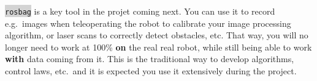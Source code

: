 \documentclass[10pt,a4paper]{upmc}
\newcommand{\mytext}[1]{\colorbox{lightgray}{\texttt{#1}}}
\begin{document}
\mytext{rosbag} is a key tool in the projet coming next. You can use it to record e.g.\ images when
teleoperating the robot to calibrate your image processing algorithm, or laser scans to correctly
detect obstacles, etc. That way, you will no longer need to work at 100\% \textbf{on} the real real
robot, while still being able to work \textbf{with} data coming from it. This is the traditional way
to develop algorithms, control laws, etc.\ and it is expected you use it extensively during the
project.
\end{document}
